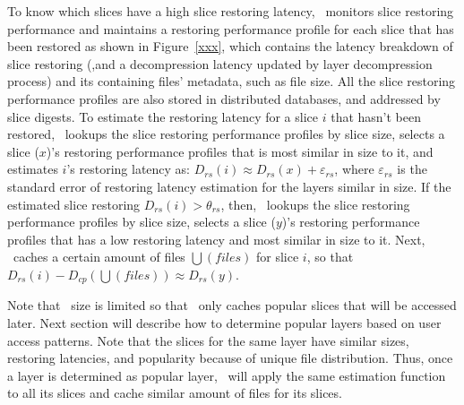 To know which slices have a high slice restoring latency,
\dedupname~monitors slice restoring performance and 
maintains a restoring performance  profile for each slice that has been restored as shown in Figure~\ref{xxx},
which contains the latency breakdown of slice restoring (,and a decompression latency updated by layer decompression process) and its containing files' metadata, such as file size.
All the slice restoring performance profiles are also stored in distributed  databases,
 and addressed by slice digests. 
To estimate the restoring latency for a slice $i$ that hasn't been restored, 
\dedupname~lookups the slice restoring performance profiles by slice size,
 selects a slice ($x$)'s restoring performance profiles that is most similar in size to it,
 and estimates $i$'s restoring latency as: $D_{rs}(i) \approx D_{rs}(x) + \varepsilon_{rs}$,
 where $\varepsilon_{rs}$ is the standard error of restoring latency estimation for the layers similar in size.
If the estimated slice restoring $D_{rs}(i) > \theta_{rs}$,
then, \dedupname~lookups the slice restoring performance profiles by slice size,
selects a slice ($y$)'s restoring performance profiles that has a low restoring latency and
most similar in size to it.
Next, \dedupname~caches a certain amount of files $\bigcup(files)$ for slice $i$, so that
$D_{rs}(i) - D_{cp}(\bigcup(files)) \approx D_{rs}(y)$.

Note that \filecachename~size is limited so that \filecachename~only caches popular slices
that will be accessed later. 
Next section will describe how to determine popular layers based on user access patterns.
Note that the slices for the same layer have similar sizes, restoring latencies, and popularity because of unique file
distribution. Thus, once a layer is determined as popular layer, \dedupname~will apply the same estimation function to all its slices and cache similar amount of files for its slices.






 




